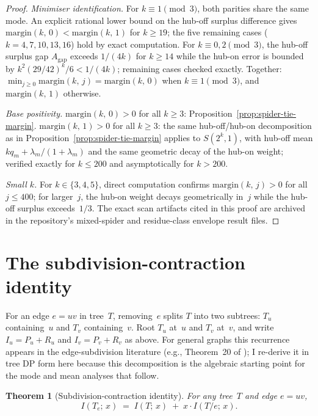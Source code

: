 \documentclass[12pt,oneside]{article}
\newtheorem{theorem}{Theorem}[section]
\theoremstyle{remark}
\begin{document}
\begin{proof}
\textit{Minimiser identification.}
For $k \equiv 1 \pmod{3}$, both parities share the same mode.
An explicit rational lower bound on the hub-off surplus difference gives $\mathrm{margin}(k,\,0) < \mathrm{margin}(k,\,1)$ for $k \ge 19$; the five remaining cases ($k = 4, 7, 10, 13, 16$) hold by exact computation.
For $k \equiv 0, 2 \pmod{3}$, the hub-off surplus gap $A_{\mathrm{gap}}$ exceeds $1/(4k)$ for $k \ge 14$ while the hub-on error is bounded by $k^2(29/42)^k/6 < 1/(4k)$; remaining cases checked exactly.
Together: $\min_{j \ge 0} \mathrm{margin}(k,\,j) = \mathrm{margin}(k,\,0)$ when $k \equiv 1 \pmod{3}$, and $\mathrm{margin}(k,\,1)$ otherwise.

\textit{Base positivity.}
$\mathrm{margin}(k,\,0) > 0$ for all $k \ge 3$: Proposition~\ref{prop:spider-tie-margin}.
$\mathrm{margin}(k,\,1) > 0$ for all $k \ge 3$: the same hub-off/hub-on decomposition as in Proposition~\ref{prop:spider-tie-margin} applies to $S(2^k, 1)$, with hub-off mean $kq_m + \lambda_m/(1 + \lambda_m)$ and the same geometric decay of the hub-on weight; verified exactly for $k \le 200$ and asymptotically for $k > 200$.

\textit{Small $k$.}
For $k \in \{3, 4, 5\}$, direct computation confirms $\mathrm{margin}(k,\, j) > 0$ for all $j \le 400$; for larger~$j$, the hub-on weight decays geometrically in~$j$ while the hub-off surplus exceeds~$1/3$.
The exact scan artifacts cited in this proof are archived in the repository's mixed-spider and residue-class envelope result files.
\end{proof}

\section{The subdivision-contraction identity}\label{sec:identity}

For an edge $e = uv$ in tree~$T$, removing~$e$ splits $T$ into two subtrees: $T_u$ containing~$u$ and $T_v$ containing~$v$.
Root $T_u$ at~$u$ and $T_v$ at~$v$, and write $I_u = P_u + R_u$ and $I_v = P_v + R_v$ as above.
For general graphs this recurrence appears in the edge-subdivision literature (e.g., Theorem~20 of \textcite{trinks2014}); I re-derive it in tree DP form here because this decomposition is the algebraic starting point for the mode and mean analyses that follow.

\begin{theorem}[Subdivision-contraction identity]\label{thm:identity}
  For any tree~$T$ and edge $e = uv$,
  \[
    I(T_e;\, x) \;=\; I(T;\, x) \;+\; x \cdot I(T/e;\, x).
  \]
\end{theorem}
\end{document}
